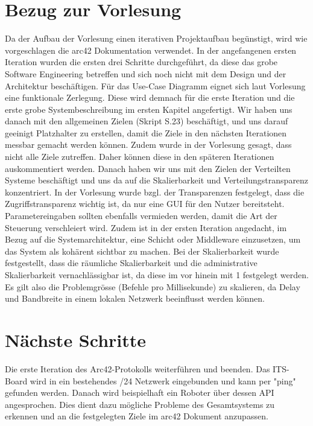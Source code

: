 \documentclass{article}
\begin{document}
\section{Bezug zur Vorlesung}
Da der Aufbau der Vorlesung einen iterativen Projektaufbau begünstigt, wird wie vorgeschlagen die arc42 Dokumentation verwendet. In der angefangenen ersten Iteration wurden die ersten drei Schritte durchgeführt, da diese das grobe Software Engineering betreffen und sich noch nicht mit dem Design und der Architektur beschäftigen. Für das Use-Case Diagramm eignet sich laut Vorlesung eine funktionale Zerlegung. Diese wird demnach für die erste Iteration und die erste grobe Systembeschreibung im ersten Kapitel angefertigt. Wir haben uns danach mit den allgemeinen Zielen (Skript S.23) beschäftigt, und uns darauf geeinigt Platzhalter zu erstellen, damit die Ziele in den nächsten Iterationen messbar gemacht werden können. Zudem wurde in der Vorlesung gesagt, dass nicht alle Ziele zutreffen. Daher können diese in den späteren Iterationen auskommentiert werden. Danach haben wir uns mit den Zielen der Verteilten Systeme beschäftigt und uns da auf die Skalierbarkeit und Verteilungstransparenz konzentriert. In der Vorlesung wurde bzgl. der Transparenzen festgelegt, dass die Zugriffstransparenz wichtig ist, da nur eine GUI für den Nutzer bereitsteht. Parametereingaben sollten ebenfalls vermieden werden, damit die Art der Steuerung verschleiert wird. Zudem ist in der ersten Iteration angedacht, im Bezug auf die Systemarchitektur, eine Schicht oder Middleware einzusetzen, um das System als kohärent sichtbar zu machen. Bei der Skalierbarkeit wurde festgestellt, dass die räumliche Skalierbarkeit und die administrative Skalierbarkeit vernachlässigbar ist, da diese im vor hinein mit 1 festgelegt werden. Es gilt also die Problemgrösse (Befehle pro Millisekunde) zu skalieren, da Delay und Bandbreite in einem lokalen Netzwerk beeinflusst werden können. 

\section{Nächste Schritte}
Die erste Iteration des Arc42-Protokolls weiterführen und beenden.
Das ITS-Board wird in ein bestehendes /24 Netzwerk eingebunden und kann per "ping" gefunden werden. Danach wird beispielhaft ein Roboter über dessen API angesprochen. Dies dient dazu mögliche Probleme des Gesamtsystems zu erkennen und an die festgelegten Ziele im arc42 Dokument anzupassen.
\end{document}
